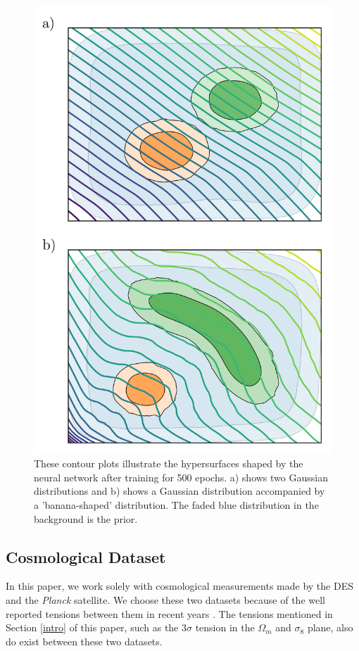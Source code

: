 \documentclass[%
 reprint,
 amsmath,amssymb,
 aps,
]{revtex4-2}
\begin{document}
\begin{figure}
    \includegraphics[width=0.8\columnwidth]{../plots/toy.png}
    \centering
    \caption{These contour plots illustrate the hypersurfaces shaped by the neural network after training for 500 epochs. a) shows two Gaussian distributions and b) shows a Gaussian distribution accompanied by a 'banana-shaped' distribution. The faded blue distribution in the background is the prior.}
    \label{fig:toy}
\end{figure}


\subsection{Cosmological Dataset}

In this paper, we work solely with cosmological measurements made by the DES and the \textit{Planck} satellite. We choose these two datasets because of the well reported tensions between them in recent years \cite{Handley2019, Lemos2020}. The tensions mentioned in Section \ref{intro} of this paper, such as the $3\sigma$ tension in the $\Omega_m$ and $\sigma_8$ plane, also do exist between these two datasets.
\end{document}
